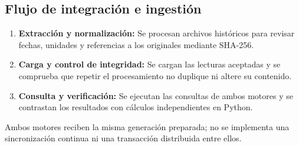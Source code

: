 \documentclass[12pt,letterpaper]{article}
\begin{document}
\subsection{Flujo de integración e ingestión}
\begin{enumerate}
    \item \textbf{Extracción y normalización:} Se procesan archivos históricos
    para revisar fechas, unidades y referencias a los originales mediante SHA-256.
    \item \textbf{Carga y control de integridad:} Se cargan las lecturas aceptadas
    y se comprueba que repetir el procesamiento no duplique ni altere su contenido.
    \item \textbf{Consulta y verificación:} Se ejecutan las consultas de ambos
    motores y se contrastan los resultados con cálculos independientes en Python.
\end{enumerate}

Ambos motores reciben la misma generación preparada; no se implementa una
sincronización continua ni una transacción distribuida entre ellos.
\end{document}
